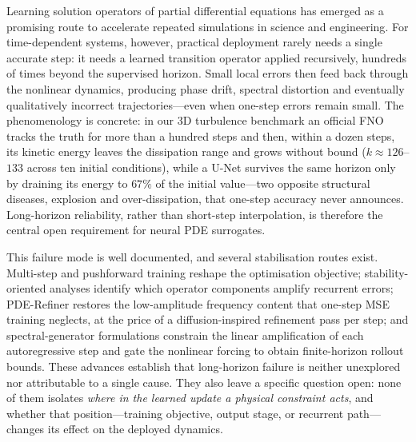 \documentclass[11pt,a4paper]{article}
\begin{document}
Learning solution operators of partial differential equations has emerged as a promising route to accelerate repeated simulations in science and engineering\cite{lu2021deeponet,li2021fno,kovachki2023,yin2024dimon,azizzadenesheli2024}. For time-dependent systems, however, practical deployment rarely needs a single accurate step: it needs a learned transition operator applied recursively, hundreds of times beyond the supervised horizon. Small local errors then feed back through the nonlinear dynamics, producing phase drift, spectral distortion and eventually qualitatively incorrect trajectories---even when one-step errors remain small\cite{brandstetter2022mpnpde,mccabe2023stability,lippe2023pderefiner}. The phenomenology is concrete: in our 3D turbulence benchmark an official FNO tracks the truth for more than a hundred steps and then, within a dozen steps, its kinetic energy leaves the dissipation range and grows without bound ($k{\approx}126$--$133$ across ten initial conditions), while a U-Net survives the same horizon only by draining its energy to $67\%$ of the initial value---two opposite structural diseases, explosion and over-dissipation, that one-step accuracy never announces. Long-horizon reliability, rather than short-step interpolation, is therefore the central open requirement for neural PDE surrogates.

This failure mode is well documented, and several stabilisation routes exist. Multi-step and pushforward training reshape the optimisation objective\cite{brandstetter2022mpnpde}; stability-oriented analyses identify which operator components amplify recurrent errors\cite{mccabe2023stability}; PDE-Refiner restores the low-amplitude frequency content that one-step MSE training neglects, at the price of a diffusion-inspired refinement pass per step\cite{lippe2023pderefiner}; and spectral-generator formulations constrain the linear amplification of each autoregressive step and gate the nonlinear forcing to obtain finite-horizon rollout bounds\cite{li2026sgno,zhang2026geoincno}. These advances establish that long-horizon failure is neither unexplored nor attributable to a single cause. They also leave a specific question open: none of them isolates \emph{where in the learned update a physical constraint acts}, and whether that position---training objective, output stage, or recurrent path---changes its effect on the deployed dynamics.
\end{document}
